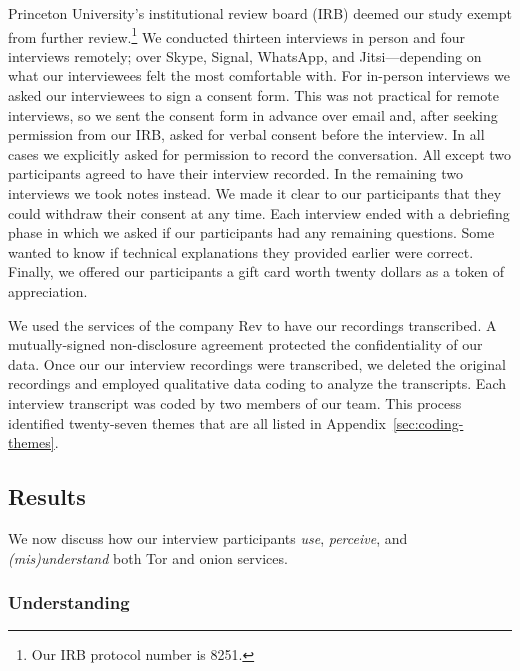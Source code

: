 Princeton University's institutional review board (IRB) deemed our study exempt
from further review.\footnote{Our IRB protocol number is 8251.}  We conducted
thirteen interviews in person and four interviews remotely; over Skype, Signal,
WhatsApp, and Jitsi---depending on what our interviewees felt the most
comfortable with.  For in-person interviews we asked our interviewees to sign a
consent form.  This was not practical for remote interviews, so we sent the
consent form in advance over email and, after seeking permission from our IRB,
asked for verbal consent before the interview.  In all cases we explicitly asked
for permission to record the conversation.  All except two participants agreed
to have their interview recorded.  In the remaining two interviews we took notes
instead.  We made it clear to our participants that they could withdraw their
consent at any time.  Each interview ended with a debriefing phase in which we
asked if our participants had any remaining questions.  Some wanted to know if
technical explanations they provided earlier were correct.  Finally, we offered
our participants a gift card worth twenty dollars as a token of appreciation.

We used the services of the company Rev to have our recordings transcribed.  A
mutually-signed non-disclosure agreement protected the confidentiality of our
data.  Once our our interview recordings were transcribed, we deleted the
original recordings and employed qualitative data coding to analyze the
transcripts.  Each interview transcript was coded by two members of our team.
This process identified twenty-seven themes that are all listed in
Appendix~\ref{sec:coding-themes}.

\subsection{Results}

We now discuss how our interview participants \emph{use}, \emph{perceive}, and
\emph{(mis)understand} both Tor and onion services.

\subsubsection{Understanding}

